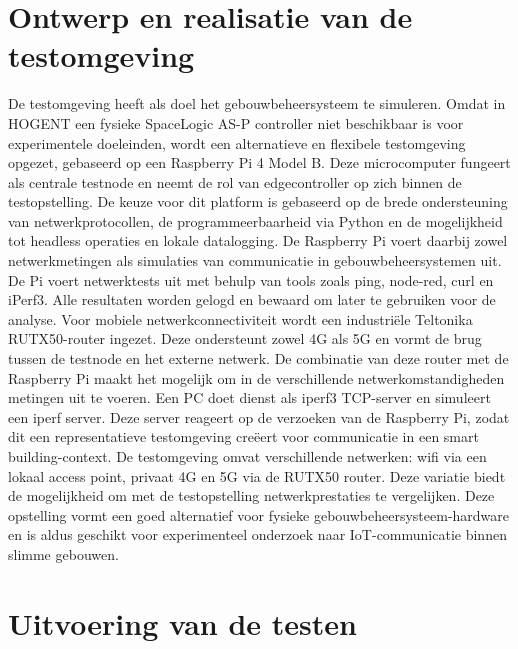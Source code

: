 \section{Ontwerp en realisatie van de testomgeving}

De testomgeving heeft als doel het gebouwbeheersysteem te simuleren. Omdat in HOGENT een fysieke SpaceLogic AS-P controller niet beschikbaar is voor experimentele doeleinden, wordt een alternatieve en flexibele testomgeving opgezet, gebaseerd op een Raspberry Pi 4 Model B. Deze microcomputer fungeert als centrale testnode en neemt de rol van edgecontroller op zich binnen de testopstelling. 
De keuze voor dit platform is gebaseerd op de brede ondersteuning van netwerkprotocollen, de programmeerbaarheid via Python en de mogelijkheid tot headless operaties en lokale datalogging. De Raspberry Pi voert daarbij zowel netwerkmetingen als simulaties van communicatie in gebouwbeheersystemen uit.
De Pi voert netwerktests uit met behulp van tools zoals ping, node-red, curl en iPerf3. Alle resultaten worden gelogd en bewaard om later te gebruiken voor de analyse.
Voor mobiele netwerkconnectiviteit wordt een industriële Teltonika RUTX50-router ingezet. Deze ondersteunt zowel 4G als 5G en vormt de brug tussen de testnode en het externe netwerk. De combinatie van deze router met de Raspberry Pi maakt het mogelijk om in de verschillende netwerkomstandigheden metingen uit te voeren.
Een PC doet dienst als iperf3 TCP-server en simuleert een iperf server. Deze server reageert op de verzoeken van de Raspberry Pi, zodat dit een representatieve testomgeving creëert voor communicatie in een smart building-context.
De testomgeving omvat verschillende netwerken: wifi via een lokaal access point, privaat 4G en 5G via de RUTX50 router. Deze variatie biedt de mogelijkheid om met de testopstelling netwerkprestaties te vergelijken.
Deze opstelling vormt een goed alternatief voor fysieke gebouwbeheersysteem-hardware en is aldus geschikt voor experimenteel onderzoek naar IoT-communicatie binnen slimme gebouwen.


\section{Uitvoering van de testen}

